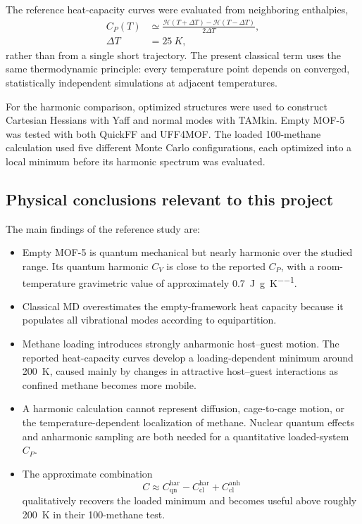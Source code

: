 \documentclass[10pt,a4paper,twocolumn]{article}
\newcommand{\cv}{\ensuremath{C_V}}
\newcommand{\cpheat}{\ensuremath{C_P}}
\begin{document}
The reference heat-capacity curves were evaluated from neighboring enthalpies,
\begin{equation}
  \begin{aligned}
  C_P(T)&\simeq
  \frac{\mathcal H(T+\Delta T)-\mathcal H(T-\Delta T)}
       {2\Delta T},
  \\
  \Delta T&=\SI{25}{K},
  \end{aligned}
  \label{eq:finite-difference-cp}
\end{equation}
rather than from a single short trajectory. The present classical term uses
the same thermodynamic principle: every temperature point depends on
converged, statistically independent simulations at adjacent temperatures.

For the harmonic comparison, optimized structures were used to construct
Cartesian Hessians with Yaff and normal modes with TAMkin. Empty MOF-5 was
tested with both QuickFF and UFF4MOF. The loaded 100-methane calculation used
five different Monte Carlo configurations, each optimized into a local
minimum before its harmonic spectrum was evaluated.

\subsection{Physical conclusions relevant to this project}

The main findings of the reference study are:

\begin{itemize}
  \item Empty MOF-5 is quantum mechanical but nearly harmonic over the studied
        range. Its quantum harmonic \cv{} is close to the reported \cpheat{},
        with a room-temperature gravimetric value of approximately
        \SI{0.7}{J\per g\per K}.
  \item Classical MD overestimates the empty-framework heat capacity because
        it populates all vibrational modes according to equipartition.
  \item Methane loading introduces strongly anharmonic host--guest motion.
        The reported heat-capacity curves develop a loading-dependent minimum
        around \SI{200}{K}, caused mainly by changes in attractive host--guest
        interactions as confined methane becomes more mobile.
  \item A harmonic calculation cannot represent diffusion, cage-to-cage
        motion, or the temperature-dependent localization of methane. Nuclear
        quantum effects and anharmonic sampling are both needed for a
        quantitative loaded-system \cpheat{}.
  \item The approximate combination
        \begin{equation}
          C \approx C_{\mathrm{qn}}^{\mathrm{har}}
          - C_{\mathrm{cl}}^{\mathrm{har}}
          + C_{\mathrm{cl}}^{\mathrm{anh}}
          \label{eq:quantum-correction}
        \end{equation}
        qualitatively recovers the loaded minimum and becomes useful above
        roughly \SI{200}{K} in their 100-methane test.
\end{itemize}
\end{document}
